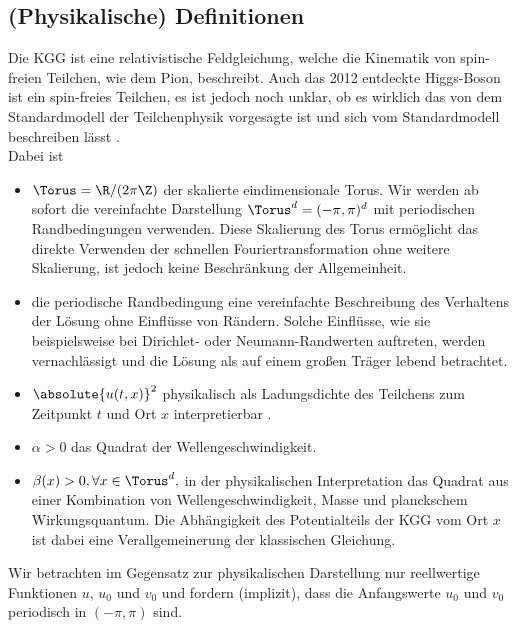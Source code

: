 \subsection{(Physikalische) Definitionen}
Die KGG ist eine relativistische Feldgleichung, welche die Kinematik von spin-freien Teilchen, wie dem Pion, beschreibt. Auch das 2012 entdeckte Higgs-Boson ist ein spin-freies Teilchen, es ist jedoch noch unklar, ob es wirklich das von dem Standardmodell der Teilchenphysik vorgesagte ist und sich vom Standardmodell beschreiben lässt \autocite{cern2016}.\\
Dabei ist
\begin{itemize}
\item $\Torus=\R/(2\pi\Z)$ der skalierte eindimensionale Torus. Wir werden ab sofort die vereinfachte Darstellung $\Torus^d=(-\pi,\pi)^d$ mit periodischen Randbedingungen verwenden. Diese Skalierung des Torus ermöglicht das direkte Verwenden der schnellen Fouriertransformation ohne weitere Skalierung, ist jedoch keine Beschränkung der Allgemeinheit. 
\item die periodische Randbedingung eine vereinfachte Beschreibung des Verhaltens der Lösung ohne Einflüsse von Rändern. Solche Einflüsse, wie sie beispielsweise bei Dirichlet- oder Neumann-Randwerten auftreten, werden vernachlässigt und die Lösung als auf einem großen Träger lebend betrachtet.
\item $\absolute{u(t,x)}^2$ physikalisch als Ladungsdichte des Teilchens zum Zeitpunkt $t$ und Ort $x$ interpretierbar \autocite{kleingordon2016}. 
\item $\alpha>0$ das Quadrat der Wellengeschwindigkeit.
\item $\beta(x)>0, \forall x\in \Torus^d,$ in der physikalischen Interpretation das Quadrat aus einer Kombination von Wellengeschwindigkeit, Masse und planckschem Wirkungsquantum. Die Abhängigkeit des Potentialteils der KGG vom Ort $x$ ist dabei eine Verallgemeinerung der klassischen Gleichung.
\end{itemize}
Wir betrachten im Gegensatz zur physikalischen Darstellung nur reellwertige Funktionen $u$, $u_0$ und $v_0$ und fordern (implizit), dass die Anfangswerte $u_0$ und $v_0$ periodisch in $(-\pi,\pi)$ sind. 

